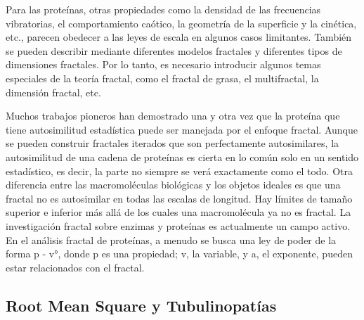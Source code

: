 \documentclass[11pt]{article}
\begin{document}
Para las proteínas, otras propiedades como la densidad de las frecuencias vibratorias, el comportamiento caótico, la geometría de la superficie y la cinética, etc., parecen obedecer a las leyes de escala en algunos casos limitantes. También se pueden describir mediante diferentes modelos fractales y diferentes tipos de dimensiones fractales. Por lo tanto, es necesario introducir algunos temas especiales de la teoría fractal, como el fractal de grasa, el multifractal, la dimensión fractal, etc.

Muchos trabajos pioneros han demostrado una y otra vez que la proteína que tiene autosimilitud estadística puede ser manejada por el enfoque fractal. Aunque se pueden construir fractales iterados que son perfectamente autosimilares, la autosimilitud de una cadena de proteínas es cierta en lo común solo en un sentido estadístico, es decir, la parte no siempre se verá exactamente como el todo. Otra diferencia entre las macromoléculas biológicas y los objetos ideales es que una fractal no es autosimilar en todas las escalas de longitud. Hay límites de tamaño superior e inferior más allá de los cuales una macromolécula ya no es fractal. La investigación fractal sobre enzimas y proteínas es actualmente un campo activo. En el análisis fractal de proteínas, a menudo se busca una ley de poder de la forma p - v°, donde p es una propiedad; v, la variable, y a, el exponente, pueden estar relacionados con el fractal.


\subsection{Root Mean Square y Tubulinopatías}
\end{document}
